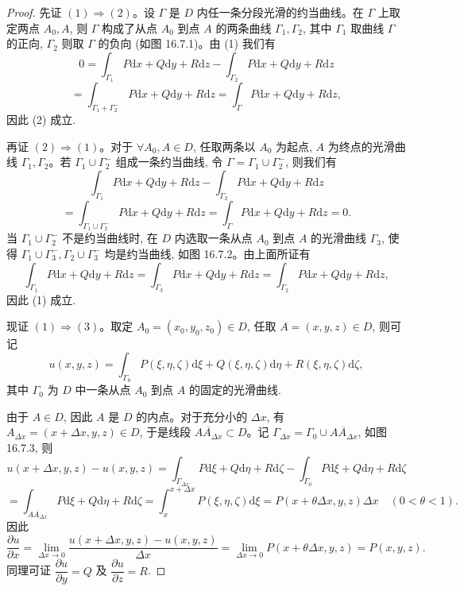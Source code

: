 \begin{proof}
先证 $(1)\Rightarrow(2)$。设 $\Gamma$ 是 $D$ 内任一条分段光滑的约当曲线。在 $\Gamma$ 上取定两点 $A_0,A$, 则 $\Gamma$ 构成了从点 $A_0$ 到点 $A$ 的两条曲线 $\Gamma_1,\Gamma_2$, 其中 $\Gamma_1$ 取曲线 $\Gamma$ 的正向, $\Gamma_2$ 则取 $\Gamma$ 的负向 (如图 16.7.1)。由 (1) 我们有
\[
  0=\int_{\Gamma_1}P\mathrm dx+Q\mathrm dy+R\mathrm dz
  -\int_{\Gamma_2}P\mathrm dx+Q\mathrm dy+R\mathrm dz
\]
\[
  =\int_{\Gamma_1+\Gamma_2^-}P\mathrm dx+Q\mathrm dy+R\mathrm dz
  =\int_\Gamma P\mathrm dx+Q\mathrm dy+R\mathrm dz,
\]
因此 (2) 成立.

再证 $(2)\Rightarrow(1)$。对于 $\forall A_0,A\in D$, 任取两条以 $A_0$ 为起点, $A$ 为终点的光滑曲线 $\Gamma_1,\Gamma_2$。若 $\Gamma_1\cup\Gamma_2^-$ 组成一条约当曲线, 令 $\Gamma=\Gamma_1\cup\Gamma_2^-$, 则我们有
\[
  \int_{\Gamma_1}P\mathrm dx+Q\mathrm dy+R\mathrm dz
  -\int_{\Gamma_2}P\mathrm dx+Q\mathrm dy+R\mathrm dz
\]
\[
  =\int_{\Gamma_1\cup\Gamma_2^-}P\mathrm dx+Q\mathrm dy+R\mathrm dz
  =\int_\Gamma P\mathrm dx+Q\mathrm dy+R\mathrm dz=0.
\]
当 $\Gamma_1\cup\Gamma_2^-$ 不是约当曲线时, 在 $D$ 内选取一条从点 $A_0$ 到点 $A$ 的光滑曲线 $\Gamma_3$, 使得 $\Gamma_1\cup\Gamma_3^-,\Gamma_2\cup\Gamma_3^-$ 均是约当曲线, 如图 16.7.2。由上面所证有
\[
  \int_{\Gamma_1}P\mathrm dx+Q\mathrm dy+R\mathrm dz
  =\int_{\Gamma_3}P\mathrm dx+Q\mathrm dy+R\mathrm dz
  =\int_{\Gamma_2}P\mathrm dx+Q\mathrm dy+R\mathrm dz,
\]
因此 (1) 成立.

现证 $(1)\Rightarrow(3)$。取定 $A_0=(x_0,y_0,z_0)\in D$, 任取 $A=(x,y,z)\in D$, 则可记
\[
  u(x,y,z)=\int_{\Gamma_0}P(\xi,\eta,\zeta)\mathrm d\xi
  +Q(\xi,\eta,\zeta)\mathrm d\eta
  +R(\xi,\eta,\zeta)\mathrm d\zeta,
\]
其中 $\Gamma_0$ 为 $D$ 中一条从点 $A_0$ 到点 $A$ 的固定的光滑曲线.

由于 $A\in D$, 因此 $A$ 是 $D$ 的内点。对于充分小的 $\Delta x$, 有 $A_{\Delta x}=(x+\Delta x,y,z)\in D$, 于是线段 $\overline{AA_{\Delta x}}\subset D$。记 $\Gamma_{\Delta x}=\Gamma_0\cup\overline{AA_{\Delta x}}$, 如图 16.7.3, 则
\[
  u(x+\Delta x,y,z)-u(x,y,z)
  =
  \int_{\Gamma_{\Delta x}}P\mathrm d\xi+Q\mathrm d\eta+R\mathrm d\zeta
  -\int_{\Gamma_0}P\mathrm d\xi+Q\mathrm d\eta+R\mathrm d\zeta
\]
\[
  =\int_{\overline{AA_{\Delta x}}}P\mathrm d\xi+Q\mathrm d\eta+R\mathrm d\zeta
  =\int_x^{x+\Delta x}P(\xi,\eta,\zeta)\mathrm d\xi
  =P(x+\theta\Delta x,y,z)\Delta x\quad(0<\theta<1).
\]
因此
\[
  \frac{\partial u}{\partial x}
  =\lim_{\Delta x\to0}\frac{u(x+\Delta x,y,z)-u(x,y,z)}{\Delta x}
  =\lim_{\Delta x\to0}P(x+\theta\Delta x,y,z)=P(x,y,z).
\]
同理可证 $\dfrac{\partial u}{\partial y}=Q$ 及 $\dfrac{\partial u}{\partial z}=R$.


\end{proof}
